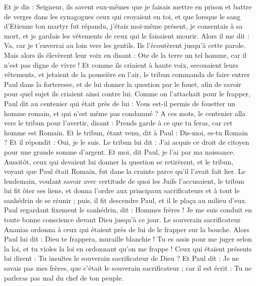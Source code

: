 \begin{multicols}{2}
Et je dis : Seigneur, ils savent eux-mêmes que je faisais mettre en prison et battre de verges dans les synagogues ceux qui croyaient en toi,
et que lorsque le sang d'Etienne ton martyr fut répandu, j’étais moi-même présent, je consentais à sa mort, et je gardais les vêtements de ceux qui le faisaient mourir.
Alors il me dit : Va, car je t'enverrai au loin vers les gentils.
Ils l'écoutèrent jusqu'à cette parole. Mais alors ils élevèrent leur voix en disant : Ote de la terre un tel homme, car il n'est pas digne de vivre !
Et comme ils criaient à haute voix, secouaient leurs vêtements, et jetaient de la poussière en l'air,
le tribun commanda de faire entrer Paul dans la forteresse, et de lui donner la question par le fouet, afin de savoir pour quel sujet ils criaient ainsi contre lui.
Comme on l’attachait pour le frapper, Paul dit au centenier qui était près de lui : Vous est-il permis de fouetter un homme romain, et qui n'est même pas condamné ?
A ces mots, le centenier alla vers le tribun pour l'avertir, disant : Prends garde à ce que tu feras, car cet homme est Romain.
Et le tribun, étant venu, dit à Paul : Dis-moi, es-tu Romain ? Et il répondit : Oui, je le suis.
Le tribun lui dit : J'ai acquis ce droit de citoyen pour une grande somme d’argent. Et moi, dit Paul, je l'ai par ma naissance.
Aussitôt, ceux qui devaient lui donner la question se retirèrent, et le tribun, voyant que Paul était Romain, fut dans la crainte parce qu’il l’avait fait lier.
Le lendemain, voulant savoir avec certitude de quoi les Juifs l’accusaient, le tribun lui fit ôter ses liens, et donna l’ordre aux principaux sacrificateurs et à tout le sanhédrin de se réunir ; puis, il fit descendre Paul, et il le plaça au milieu d’eux.
\VerseOne{}Paul regardant fixement le sanhédrin, dit : Hommes frères ! Je me suis conduit en toute bonne conscience devant Dieu jusqu'à ce jour.
Le souverain sacrificateur Ananias ordonna à ceux qui étaient près de lui de le frapper sur la bouche.
Alors Paul lui dit : Dieu te frappera, muraille blanchie ! Tu es assis pour me juger selon la loi, et tu violes la loi en ordonnant qu’on me frappe !
Ceux qui étaient présents lui dirent : Tu insultes le souverain sacrificateur de Dieu ?
Et Paul dit : Je ne savais pas mes frères, que c’était le souverain sacrificateur ; car il est écrit : Tu ne parleras pas mal du chef de ton peuple.

\end{multicols}
